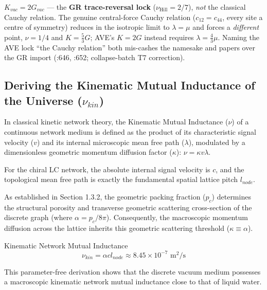 $K_{vac} = 2G_{vac}$ --- the \textbf{GR trace-reversal lock} ($\nu_\text{Hill} = 2/7$), \emph{not} the classical Cauchy relation. The genuine central-force Cauchy relation ($c_{12} = c_{44}$, every site a centre of symmetry) reduces in the isotropic limit to $\lambda = \mu$ and forces a \emph{different} point, $\nu = 1/4$ and $K = \tfrac{5}{3}G$; AVE's $K = 2G$ instead requires $\lambda = \tfrac{4}{3}\mu$. Naming the AVE lock ``the Cauchy relation'' both mis-cashes the namesake and papers over the GR import (:646, :652; collapse-batch T7 correction).

\subsection{Deriving the Kinematic Mutual Inductance of the Universe ($\nu_{kin}$)}

In classical kinetic network theory, the Kinematic Mutual Inductance ($\nu$) of a continuous network medium is defined as the product of its characteristic signal velocity ($v$) and its internal microscopic mean free path ($\lambda$), modulated by a dimensionless geometric momentum diffusion factor ($\kappa$): $\nu = \kappa v \lambda$.

For the chiral LC network, the absolute internal signal velocity is $c$, and the topological
mean free path is exactly the fundamental spatial lattice pitch $l_{node}$.

As established in Section 1.3.2, the geometric packing fraction ($p_c$) determines the structural porosity and transverse geometric scattering cross-section of the discrete graph (where $\alpha = p_c/8\pi$). Consequently, the macroscopic momentum diffusion across the lattice inherits this geometric scattering threshold ($\kappa \equiv \alpha$).

\begin{resultbox}{Kinematic Network Mutual Inductance}
\begin{equation}
\nu_{kin}=\alpha c l_{node}\approx8.45\times10^{-7}\text{ m}^{2}\text{/s}
\end{equation}
\end{resultbox}

This parameter-free derivation shows that the discrete vacuum medium possesses
a macroscopic kinematic network mutual inductance close to that of liquid water.

